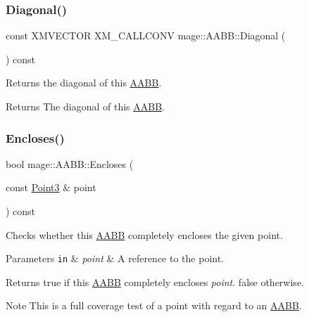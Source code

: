 \subsubsection{\texorpdfstring{Diagonal()}{Diagonal()}}
{\footnotesize\ttfamily const X\+M\+V\+E\+C\+T\+OR X\+M\+\_\+\+C\+A\+L\+L\+C\+O\+NV mage\+::\+A\+A\+B\+B\+::\+Diagonal (\begin{DoxyParamCaption}{ }\end{DoxyParamCaption}) const\hspace{0.3cm}{\ttfamily [noexcept]}}

Returns the diagonal of this \hyperlink{classmage_1_1_a_a_b_b}{A\+A\+BB}.

\begin{DoxyReturn}{Returns}
The diagonal of this \hyperlink{classmage_1_1_a_a_b_b}{A\+A\+BB}. 
\end{DoxyReturn}
\hypertarget{classmage_1_1_a_a_b_b_a308fce591178a9aeaed3838dfa32972f}{}\label{classmage_1_1_a_a_b_b_a308fce591178a9aeaed3838dfa32972f} 
\subsubsection{\texorpdfstring{Encloses()}{Encloses()}\hspace{0.1cm}{\footnotesize\ttfamily [1/4]}}
{\footnotesize\ttfamily bool mage\+::\+A\+A\+B\+B\+::\+Encloses (\begin{DoxyParamCaption}\item[{const \hyperlink{structmage_1_1_point3}{Point3} \&}]{point }\end{DoxyParamCaption}) const\hspace{0.3cm}{\ttfamily [noexcept]}}

Checks whether this \hyperlink{classmage_1_1_a_a_b_b}{A\+A\+BB} completely encloses the given point.


\begin{DoxyParams}[1]{Parameters}
\mbox{\tt in}  & {\em point} & A reference to the point. \\
\hline
\end{DoxyParams}
\begin{DoxyReturn}{Returns}
{\ttfamily true} if this \hyperlink{classmage_1_1_a_a_b_b}{A\+A\+BB} completely encloses {\itshape point}. {\ttfamily false} otherwise. 
\end{DoxyReturn}
\begin{DoxyNote}{Note}
This is a full coverage test of a point with regard to an \hyperlink{classmage_1_1_a_a_b_b}{A\+A\+BB}. 
\end{DoxyNote}
\hypertarget{classmage_1_1_a_a_b_b_a97e3f57fc91e4fea04572382c94f4279}{}\label{classmage_1_1_a_a_b_b_a97e3f57fc91e4fea04572382c94f4279} 
